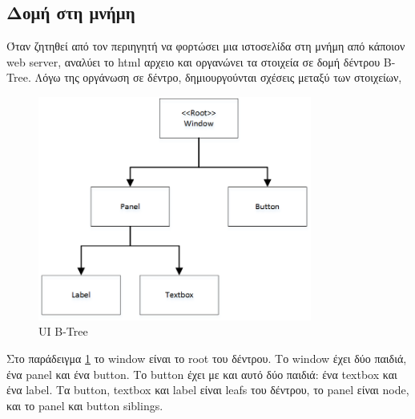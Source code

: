 \subsection{Δομή στη μνήμη}	
Όταν ζητηθεί από τον περιηγητή να φορτώσει μια ιστοσελίδα στη μνήμη από κάποιον web server, αναλύει το html αρχειο και οργανώνει τα στοιχεία σε δομή δέντρου \gls{B-Tree}. Λόγω της οργάνωση σε δέντρο, δημιουργούνται σχέσεις μεταξύ των στοιχείων, 

	\begin{figure}[h!]
		\centering
		\includegraphics[width=90mm]{Images/ui_btree}
		\caption{UI B-Tree}
		\label{fig:ui_b-tree}
	\end{figure}
	
Στο παράδειγμα \ref{fig:ui_b-tree}  το window είναι το root του δέντρου. Το window έχει δύο παιδιά, ένα panel και ένα button. Το button έχει με και αυτό δύο παιδιά: ένα textbox και ένα label. Τα button, textbox και label είναι leafs του δέντρου, το panel είναι node, και το panel και button siblings.

